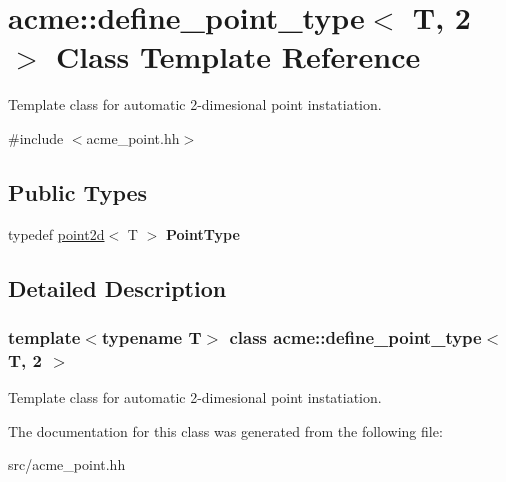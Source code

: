 \hypertarget{classacme_1_1define__point__type_3_01_t_00_012_01_4}{}\section{acme\+:\+:define\+\_\+point\+\_\+type$<$ T, 2 $>$ Class Template Reference}
\label{classacme_1_1define__point__type_3_01_t_00_012_01_4}


Template class for automatic 2-\/dimesional point instatiation.  




{\ttfamily \#include $<$acme\+\_\+point.\+hh$>$}

\subsection*{Public Types}
\begin{DoxyCompactItemize}
\item 
\mbox{\label{classacme_1_1define__point__type_3_01_t_00_012_01_4_adaf48e9a357b2d3383a264ff50046b85}} 
typedef \hyperlink{classacme_1_1point2d}{point2d}$<$ T $>$ {\bfseries Point\+Type}
\end{DoxyCompactItemize}


\subsection{Detailed Description}
\subsubsection*{template$<$typename T$>$\newline
class acme\+::define\+\_\+point\+\_\+type$<$ T, 2 $>$}

Template class for automatic 2-\/dimesional point instatiation. 

The documentation for this class was generated from the following file\+:\begin{DoxyCompactItemize}
\item 
src/acme\+\_\+point.\+hh\end{DoxyCompactItemize}
